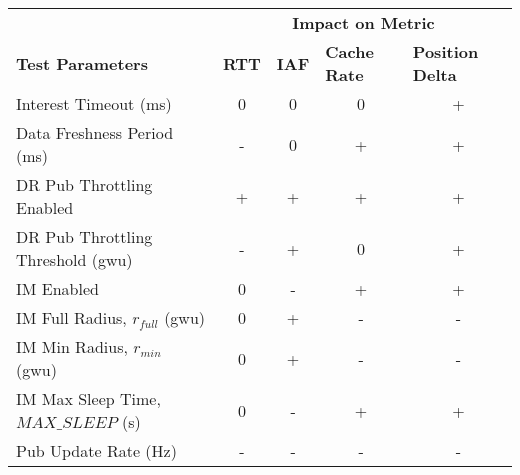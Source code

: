 \begin{table}[H]
    \centering
    \begin{tabular}{@{}lcccc@{}}
        & \multicolumn{4}{c}{\textbf{Impact on Metric}}                                                                                                               \\
    \multirow{-2}{*}{\textbf{Test Parameters}} & \multicolumn{1}{l}{\textbf{RTT}} & \multicolumn{1}{l}{\textbf{IAF}} & \multicolumn{1}{l}{\textbf{Cache Rate}} & \multicolumn{1}{l}{\textbf{Position Delta}} \\
    Interest Timeout (ms)                      & 0                                & 0                                & 0                                       & \cellcolor[HTML]{FFCCC9}+                   \\
    Data Freshness Period (ms)                 & \cellcolor[HTML]{9AFF99}-        & 0                                & \cellcolor[HTML]{9AFF99}+               & \cellcolor[HTML]{FFCCC9}+                   \\
    DR Pub Throttling Enabled                  & \cellcolor[HTML]{FFCCC9}+        & \cellcolor[HTML]{9AFF99}+        & \cellcolor[HTML]{9AFF99}+               & \cellcolor[HTML]{FFCCC9}+                   \\
    DR Pub Throttling Threshold (gwu)          & \cellcolor[HTML]{9AFF99}-        & \cellcolor[HTML]{9AFF99}+        & 0                                       & \cellcolor[HTML]{FFCCC9}+                   \\
    IM Enabled                                 & 0                                & \cellcolor[HTML]{FFCCC9}-        & \cellcolor[HTML]{9AFF99}+               & \cellcolor[HTML]{FFCCC9}+                   \\
    IM Full Radius, $r_{full}$ (gwu)              & 0                                & \cellcolor[HTML]{9AFF99}+        & \cellcolor[HTML]{FFCCC9}-               & \cellcolor[HTML]{9AFF99}-                   \\
    IM Min Radius, $r_{min}$ (gwu)                & 0                                & \cellcolor[HTML]{9AFF99}+        & \cellcolor[HTML]{FFCCC9}-               & \cellcolor[HTML]{9AFF99}-                   \\
    IM Max Sleep Time, $MAX\_SLEEP$ (s)          & 0                                & \cellcolor[HTML]{FFCCC9}-        & \cellcolor[HTML]{9AFF99}+               & \cellcolor[HTML]{FFCCC9}+                   \\
    Pub Update Rate (Hz)                           & \cellcolor[HTML]{FFCCC9}-        & \cellcolor[HTML]{FFCCC9}-        & \cellcolor[HTML]{FFCCC9}-               & \cellcolor[HTML]{9AFF99}-                   \\

\end{tabular}
\end{table}
